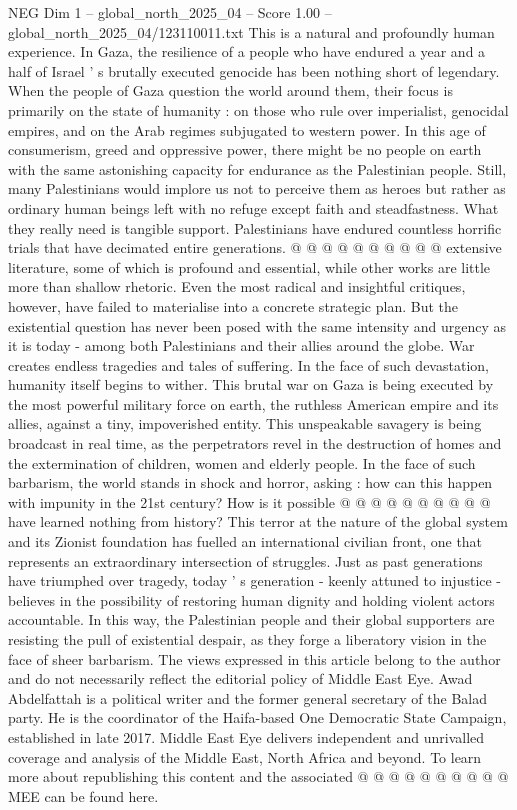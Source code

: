 \begin{textsample}{NEG Dim 1 – global\_north\_2025\_04 – Score 1.00 – global\_north\_2025\_04/123110011.txt}
This is a natural and profoundly human experience.
In Gaza, the resilience of a people who have endured a year and a half of Israel ' s brutally executed genocide has been nothing short of legendary.
When the people of Gaza question the world around them, their focus is primarily on the state of humanity : on those who rule over imperialist, genocidal empires, and on the Arab regimes subjugated to western power.
In this age of consumerism, greed and oppressive power, there might be no people on earth with the same astonishing capacity for endurance as the Palestinian people.
Still, many Palestinians would implore us not to perceive them as heroes but rather as ordinary human beings left with no refuge except faith and steadfastness.
What they really need is tangible support.
Palestinians have endured countless horrific trials that have decimated entire generations. @ @ @ @ @ @ @ @ @ @ extensive literature, some of which is profound and essential, while other works are little more than shallow rhetoric.
Even the most radical and insightful critiques, however, have failed to materialise into a concrete strategic plan.
But the existential question has never been posed with the same intensity and urgency as it is today - among both Palestinians and their allies around the globe.
War creates endless tragedies and tales of suffering.
In the face of such devastation, humanity itself begins to wither.
This brutal war on Gaza is being executed by the most powerful military force on earth, the ruthless American empire and its allies, against a tiny, impoverished entity.
This unspeakable savagery is being broadcast in real time, as the perpetrators revel in the destruction of homes and the extermination of children, women and elderly people.
In the face of such barbarism, the world stands in shock and horror, asking : how can this happen with impunity in the 21st century?
How is it possible @ @ @ @ @ @ @ @ @ @ have learned nothing from history?
This terror at the nature of the global system and its Zionist foundation has fuelled an international civilian front, one that represents an extraordinary intersection of struggles.
Just as past generations have triumphed over tragedy, today ' s generation - keenly attuned to injustice - believes in the possibility of restoring human dignity and holding violent actors accountable.
In this way, the Palestinian people and their global supporters are resisting the pull of existential despair, as they forge a liberatory vision in the face of sheer barbarism.
The views expressed in this article belong to the author and do not necessarily reflect the editorial policy of Middle East Eye.
Awad Abdelfattah is a political writer and the former general secretary of the Balad party.
He is the coordinator of the Haifa-based One Democratic State Campaign, established in late 2017.
Middle East Eye delivers independent and unrivalled coverage and analysis of the Middle East, North Africa and beyond.
To learn more about republishing this content and the associated @ @ @ @ @ @ @ @ @ @ MEE can be found here.

\end{textsample}
